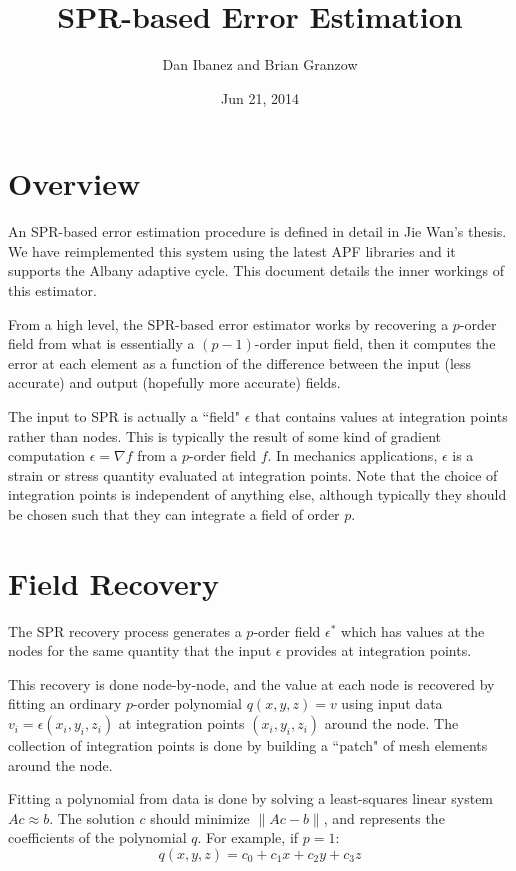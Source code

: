 \documentclass{article}
\title{SPR-based Error Estimation}
\author{Dan Ibanez and Brian Granzow}
\date{Jun 21, 2014}
\begin{document}
\maketitle

\section{Overview}
An SPR-based error estimation procedure is defined in detail
in Jie Wan's thesis.
We have reimplemented this system using the latest APF
libraries and it supports the Albany adaptive cycle.
This document details the inner workings of this estimator.

From a high level, the SPR-based error estimator works by
recovering a $p$-order field from what is essentially
a $(p-1)$-order input field, then it computes the
error at each element as a function of the difference
between the input (less accurate) and output
(hopefully more accurate) fields. 

The input to SPR is actually a ``field" $\epsilon$ that contains values
at integration points rather than nodes.
This is typically the result of some kind of gradient computation
$\epsilon = \nabla f$ from a $p$-order field $f$.
In mechanics applications, $\epsilon$ is a strain or stress quantity
evaluated at integration points.
Note that the choice of integration points is independent of
anything else, although typically they should be chosen such
that they can integrate a field of order $p$.

\section{Field Recovery}
The SPR recovery process generates a $p$-order field $\epsilon^*$ which
has values at the nodes for the same quantity that the
input $\epsilon$ provides at integration points.

This recovery is done node-by-node, and the value at each
node is recovered by fitting an ordinary $p$-order polynomial
$q (x, y, z) = v$ using input data $v_i = \epsilon(x_i, y_i, z_i)$
at integration points $(x_i,y_i,z_i)$ around the node.
The collection of integration points is done by building
a ``patch" of mesh elements around the node.

Fitting a polynomial from data is done by solving a least-squares linear
system $Ac \approx b$.
The solution $c$ should minimize $\|Ac - b\|$, and represents
the coefficients of the polynomial $q$.
For example, if $p=1$:
\[q(x,y,z) = c_0 + c_1 x + c_2 y + c_3 z \]
\end{document}
